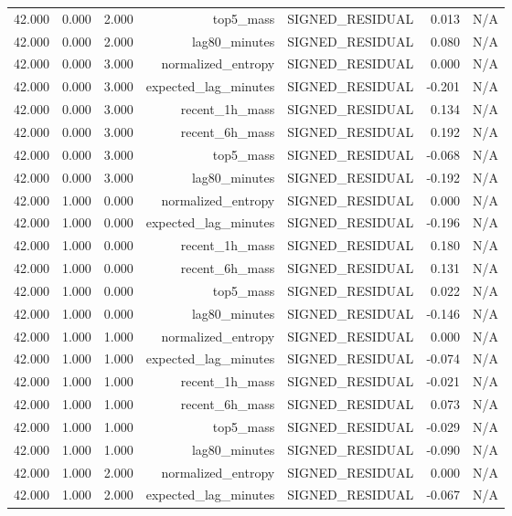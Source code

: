 \begin{table}[h!]
\begin{tabular}{lrrrrrr}
42.000 & 0.000 & 2.000 & top5\_mass & SIGNED\_RESIDUAL & 0.013 & N/A \\
42.000 & 0.000 & 2.000 & lag80\_minutes & SIGNED\_RESIDUAL & 0.080 & N/A \\
42.000 & 0.000 & 3.000 & normalized\_entropy & SIGNED\_RESIDUAL & 0.000 & N/A \\
42.000 & 0.000 & 3.000 & expected\_lag\_minutes & SIGNED\_RESIDUAL & -0.201 & N/A \\
42.000 & 0.000 & 3.000 & recent\_1h\_mass & SIGNED\_RESIDUAL & 0.134 & N/A \\
42.000 & 0.000 & 3.000 & recent\_6h\_mass & SIGNED\_RESIDUAL & 0.192 & N/A \\
42.000 & 0.000 & 3.000 & top5\_mass & SIGNED\_RESIDUAL & -0.068 & N/A \\
42.000 & 0.000 & 3.000 & lag80\_minutes & SIGNED\_RESIDUAL & -0.192 & N/A \\
42.000 & 1.000 & 0.000 & normalized\_entropy & SIGNED\_RESIDUAL & 0.000 & N/A \\
42.000 & 1.000 & 0.000 & expected\_lag\_minutes & SIGNED\_RESIDUAL & -0.196 & N/A \\
42.000 & 1.000 & 0.000 & recent\_1h\_mass & SIGNED\_RESIDUAL & 0.180 & N/A \\
42.000 & 1.000 & 0.000 & recent\_6h\_mass & SIGNED\_RESIDUAL & 0.131 & N/A \\
42.000 & 1.000 & 0.000 & top5\_mass & SIGNED\_RESIDUAL & 0.022 & N/A \\
42.000 & 1.000 & 0.000 & lag80\_minutes & SIGNED\_RESIDUAL & -0.146 & N/A \\
42.000 & 1.000 & 1.000 & normalized\_entropy & SIGNED\_RESIDUAL & 0.000 & N/A \\
42.000 & 1.000 & 1.000 & expected\_lag\_minutes & SIGNED\_RESIDUAL & -0.074 & N/A \\
42.000 & 1.000 & 1.000 & recent\_1h\_mass & SIGNED\_RESIDUAL & -0.021 & N/A \\
42.000 & 1.000 & 1.000 & recent\_6h\_mass & SIGNED\_RESIDUAL & 0.073 & N/A \\
42.000 & 1.000 & 1.000 & top5\_mass & SIGNED\_RESIDUAL & -0.029 & N/A \\
42.000 & 1.000 & 1.000 & lag80\_minutes & SIGNED\_RESIDUAL & -0.090 & N/A \\
42.000 & 1.000 & 2.000 & normalized\_entropy & SIGNED\_RESIDUAL & 0.000 & N/A \\
42.000 & 1.000 & 2.000 & expected\_lag\_minutes & SIGNED\_RESIDUAL & -0.067 & N/A \\

\end{tabular}
\end{table}

